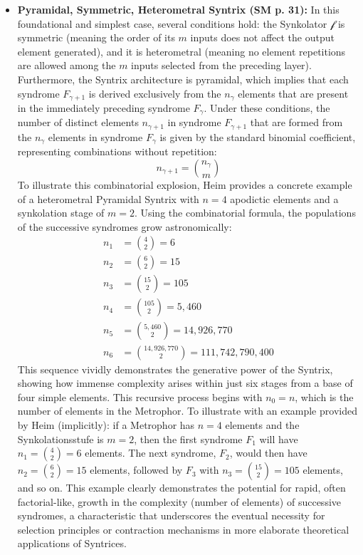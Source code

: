 \documentclass[12pt]{article}
\newcommand{\synkolator}{\mathcal{f}}
\newcommand{\synkolationsstufe}{m}
\newcommand{\syndrom}{F}
\begin{document}
\begin{itemize}
    \item \textbf{Pyramidal, Symmetric, Heterometral Syntrix (SM p. 31):}
    In this foundational and simplest case, several conditions hold: the Synkolator \( \synkolator \) is symmetric (meaning the order of its \( \synkolationsstufe \) inputs does not affect the output element generated), and it is heterometral (meaning no element repetitions are allowed among the \( \synkolationsstufe \) inputs selected from the preceding layer). Furthermore, the Syntrix architecture is pyramidal, which implies that each syndrome \( \syndrom_{\gamma+1} \) is derived exclusively from the \( n_\gamma \) elements that are present in the immediately preceding syndrome \( \syndrom_\gamma \). Under these conditions, the number of distinct elements \( n_{\gamma+1} \) in syndrome \( \syndrom_{\gamma+1} \) that are formed from the \( n_\gamma \) elements in syndrome \( \syndrom_\gamma \) is given by the standard binomial coefficient, representing combinations without repetition:
    \begin{equation*}
    n_{\gamma+1} = \binom{n_\gamma}{\synkolationsstufe}
    \end{equation*}
    To illustrate this combinatorial explosion, Heim provides a concrete example of a heterometral Pyramidal Syntrix with $n = 4$ apodictic elements and a synkolation stage of $m = 2$. Using the combinatorial formula, the populations of the successive syndromes grow astronomically:
\begin{align*}
n_1 &= \binom{4}{2} = 6 \\
n_2 &= \binom{6}{2} = 15 \\
n_3 &= \binom{15}{2} = 105 \\
n_4 &= \binom{105}{2} = 5,460 \\
n_5 &= \binom{5,460}{2} = 14,926,770 \\
n_6 &= \binom{14,926,770}{2} = 111,742,790,400
\end{align*}
This sequence vividly demonstrates the generative power of the Syntrix, showing how immense complexity arises within just six stages from a base of four simple elements.
    This recursive process begins with \( n_0 = n \), which is the number of elements in the Metrophor. To illustrate with an example provided by Heim (implicitly): if a Metrophor has \( n=4 \) elements and the Synkolationsstufe is \( \synkolationsstufe=2 \), then the first syndrome \( \syndrom_1 \) will have \( n_1 = \binom{4}{2}=6 \) elements. The next syndrome, \( \syndrom_2 \), would then have \( n_2 = \binom{6}{2}=15 \) elements, followed by \( \syndrom_3 \) with \( n_3 = \binom{15}{2}=105 \) elements, and so on. This example clearly demonstrates the potential for rapid, often factorial-like, growth in the complexity (number of elements) of successive syndromes, a characteristic that underscores the eventual necessity for selection principles or contraction mechanisms in more elaborate theoretical applications of Syntrices.


\end{itemize}
\end{document}
